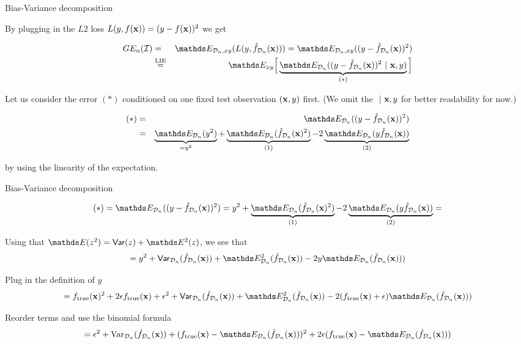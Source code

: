 \documentclass[11pt,compress,t,notes=noshow, xcolor=table]{beamer}
\begin{document}
\begin{frame}{Bias-Variance decomposition}

By plugging in the $L2$ loss $L(y, f(\mathbf{x})) = (y - f(\mathbf{x}))^2$ we get

{\footnotesize
\begin{eqnarray*}
GE_n(\ind) &=& \E_{\D_n, xy}( L(y, \fh_{\D_n}(\xv))) = \E_{\D_n, xy}((y - \fh_{\D_n}(\xv))^2) \\
&\stackrel{\text{LIE}}{=}& \E_{xy}\Big[\underbrace{\E_{\D_n}((y - \fh_{\D_n}(\xv))^2~|~ \xv, y)}_{(*)}\Big] 
\end{eqnarray*}
}

Let us consider the error $(*)$ conditioned on one fixed test observation $(\mathbf{x}, y)$ first. (We omit the $~|~\mathbf{x}, y$ for better readability for now.)

{\footnotesize
\begin{eqnarray*}
(*) &=& \E_{\D_n}((y - \fh_{\D_n}(\xv))^2)\\
&=& \underbrace{\E_{\D_n}(y^2)}_{= y^2} + \underbrace{\E_{\D_n}(\fh_{\D_n}(\xv)^2)}_{(1)}  - 2\underbrace{\E_{\D_n}(y\fh_{\D_n}(\xv))}_{(2)} 
\end{eqnarray*}
}

by using the linearity of the expectation.  %

\end{frame}
\begin{frame2}[footnotesize]{Bias-Variance decomposition}

$$
(*) = \E_{\D_n}((y - \fh_{\D_n}(\xv))^2) = 
y^2 + \underbrace{\E_{\D_n}(\fh_{\D_n}(\xv)^2)}_{(1)}  - 2\underbrace{\E_{\D_n}(y\fh_{\D_n}(\xv))}_{(2)} =
$$

\vfill

Using that $\E(z^2) =\var(z) + \E^2(z)$, we see that
$$
= y^2 + \var_{\D_n}(\fh_{\D_n}(\xv)) + \E^2_{\D_n}(\fh_{\D_n}(\xv)) - 2y \E_{\D_n}(\fh_{\D_n}(\xv))) 
$$

\vfill

Plug in the definition of $y$
$$
 = \ftrue(\xv)^2 +2\epsilon\ftrue(\xv) + \epsilon^2 + \var_{\D_n}(\fh_{\D_n}(\xv)) + \E^2_{\D_n}(\fh_{\D_n}(\xv)) - 2 (\ftrue(\xv)+\epsilon)\E_{\D_n}(\fh_{\D_n}(\xv))) 
$$

\vfill

Reorder terms and use the binomial formula
$$
= \epsilon^2 + \text{Var}_{\D_n}(\fh_{\D_n}(\xv)) + 
  (\ftrue(\xv) - \E_{\D_n}(\fh_{\D_n}(\xv)))^2
 +2 \epsilon (\ftrue(\xv) - \E_{\D_n}(\fh_{\D_n}(\xv)))
$$

\end{frame2}
\end{document}
